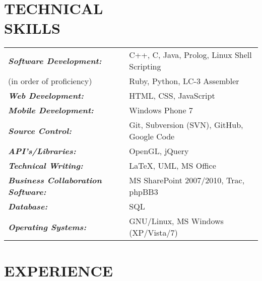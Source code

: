 \documentclass[margin]{res}
\begin{document}
\begin{resume}
\section{TECHNICAL \\ SKILLS}
	\begin{tabular}{l l}
	{\sl \textbf{Software Development:}} &
  C++, C, Java, Prolog, Linux Shell Scripting \\ (in order of proficiency) &
  Ruby, Python, LC-3 Assembler \\

	{\sl \textbf{Web Development:}} &
	HTML, CSS, JavaScript \\

	{\sl \textbf{Mobile Development:}} &
	Windows Phone 7 \\

	{\sl \textbf{Source Control:}} &
	Git, Subversion (SVN), GitHub, Google Code \\

	{\sl \textbf{API's/Libraries:}} &
	OpenGL, jQuery \\

	{\sl \textbf{Technical Writing:}} &
	\LaTeX, UML, MS Office \\

	{\sl \textbf{Business Collaboration Software:}} &
  MS SharePoint 2007/2010, Trac, phpBB3 \\
	  
	{\sl \textbf{Database:}} &	  
  SQL \\	  
	  
	{\sl \textbf{Operating Systems:}} &
  GNU/Linux, MS Windows (XP/Vista/7)

	\end{tabular}	 

\section{EXPERIENCE}


\end{resume}
\end{document}
